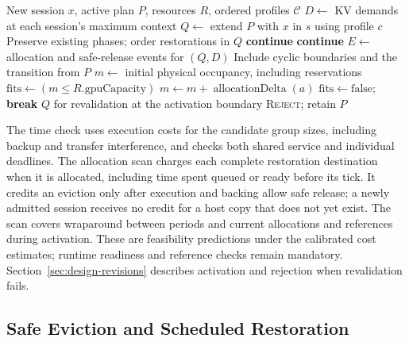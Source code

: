 \begin{algorithm}[t]
\caption{Admission with a recurring residency plan}
\label{alg:admission}
\begin{algorithmic}[1]
\Require New session $x$, active plan $P$, resources $R$, ordered profiles $\mathcal{C}$
\State $D \gets$ KV demands at each session's maximum context
    \State $Q \gets$ extend $P$ with $x$ in $s$ using profile $c$
    \State Preserve existing phases; order restorations in $Q$
      \State \textbf{continue}
    \EndIf
      \State \textbf{continue}
    \EndIf
    \State $E \gets$ allocation and safe-release events for $(Q,D)$
    \State Include cyclic boundaries and the transition from $P$
    \State $m \gets$ initial physical occupancy, including reservations
    \State $\mathrm{fits} \gets (m \le R.\mathrm{gpuCapacity})$
      \State $m \gets m + \operatorname{allocationDelta}(a)$
        \State $\mathrm{fits} \gets \mathrm{false}$; \textbf{break}
      \EndIf
    \EndFor
      \State \Return $Q$ for revalidation at the activation boundary
    \EndIf
  \EndFor
\EndFor
\State \Return \textsc{Reject}; retain $P$
\end{algorithmic}
\end{algorithm}

The time check uses execution costs for the candidate group sizes, including backup and transfer interference, and checks both shared service and individual deadlines.
The allocation scan charges each complete restoration destination when it is allocated, including time spent queued or ready before its tick.
It credits an eviction only after execution and backing allow safe release; a newly admitted session receives no credit for a host copy that does not yet exist.
The scan covers wraparound between periods and current allocations and references during activation.
These are feasibility predictions under the calibrated cost estimates; runtime readiness and reference checks remain mandatory.
Section~\ref{sec:design-revisions} describes activation and rejection when revalidation fails.

\subsection{Safe Eviction and Scheduled Restoration}
\label{sec:design-idle}
\label{sec:design-correctness}

